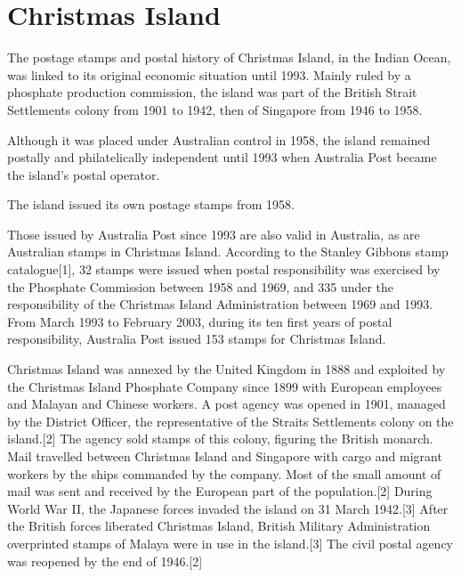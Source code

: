 \chapter{Christmas Island}

The postage stamps and postal history of Christmas Island, in the Indian Ocean, was linked to its original economic situation until 1993. Mainly ruled by a phosphate production commission, the island was part of the British Strait Settlements colony from 1901 to 1942, then of Singapore from 1946 to 1958. 

Although it was placed under Australian control in 1958, the island remained postally and philatelically independent until 1993 when Australia Post became the island's postal operator.


The island issued its own postage stamps from 1958. 



Those issued by Australia Post since 1993 are also valid in Australia, 
as are Australian stamps in Christmas Island.
According to the Stanley Gibbons stamp catalogue[1], 32 stamps 
were issued when postal responsibility was exercised by the Phosphate
Commission between 1958 and 1969, and 335 under the responsibility of the Christmas Island Administration between 1969 and 1993. From March 1993 to February 2003, during its ten first years of postal responsibility, Australia Post issued 153 stamps for Christmas Island.


Christmas Island was annexed by the United Kingdom in 1888 and
exploited by the Christmas Island Phosphate Company since 1899
with European employees and Malayan and Chinese workers. A post
agency was opened in 1901, managed by the District Officer, the
representative of the Straits Settlements colony on the island.[2]
The agency sold stamps of this colony, figuring the British monarch.
Mail travelled between Christmas Island and Singapore with cargo
and migrant workers by the ships commanded by the company. Most of
the small amount of mail was sent and received by the European part
of the population.[2]
During World War II, the Japanese forces invaded the island on
31 March 1942.[3] After the British forces liberated Christmas
Island, British Military Administration overprinted stamps of
Malaya were in use in the island.[3] The civil postal agency 
was reopened by the end of 1946.[2]

